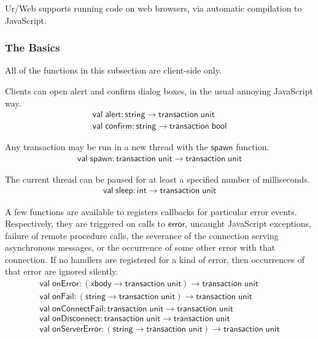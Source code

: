 \documentclass{article}
\newcommand{\mt}[1]{\mathsf{#1}}
\begin{document}
Ur/Web supports running code on web browsers, via automatic compilation to JavaScript.

\subsubsection{The Basics}

All of the functions in this subsection are client-side only.

Clients can open alert and confirm dialog boxes, in the usual annoying JavaScript way.
$$\begin{array}{l}
  \mt{val} \; \mt{alert} : \mt{string} \to \mt{transaction} \; \mt{unit} \\
  \mt{val} \; \mt{confirm} : \mt{string} \to \mt{transaction} \; \mt{bool}
\end{array}$$

Any transaction may be run in a new thread with the $\mt{spawn}$ function.
$$\begin{array}{l}
  \mt{val} \; \mt{spawn} : \mt{transaction} \; \mt{unit} \to \mt{transaction} \; \mt{unit}
\end{array}$$

The current thread can be paused for at least a specified number of milliseconds.
$$\begin{array}{l}
  \mt{val} \; \mt{sleep} : \mt{int} \to \mt{transaction} \; \mt{unit}
\end{array}$$

A few functions are available to registers callbacks for particular error events.  Respectively, they are triggered on calls to $\mt{error}$, uncaught JavaScript exceptions, failure of remote procedure calls, the severance of the connection serving asynchronous messages, or the occurrence of some other error with that connection.  If no handlers are registered for a kind of error, then occurrences of that error are ignored silently.
$$\begin{array}{l}
  \mt{val} \; \mt{onError} : (\mt{xbody} \to \mt{transaction} \; \mt{unit}) \to \mt{transaction} \; \mt{unit} \\
  \mt{val} \; \mt{onFail} : (\mt{string} \to \mt{transaction} \; \mt{unit}) \to \mt{transaction} \; \mt{unit} \\
  \mt{val} \; \mt{onConnectFail} : \mt{transaction} \; \mt{unit} \to \mt{transaction} \; \mt{unit} \\
  \mt{val} \; \mt{onDisconnect} : \mt{transaction} \; \mt{unit} \to \mt{transaction} \; \mt{unit} \\
  \mt{val} \; \mt{onServerError} : (\mt{string} \to \mt{transaction} \; \mt{unit}) \to \mt{transaction} \; \mt{unit}
\end{array}$$
\end{document}
